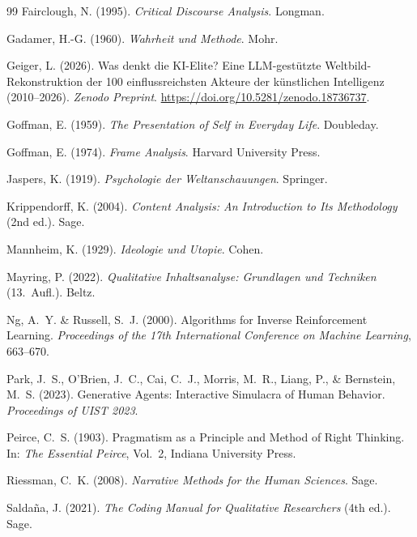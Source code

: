 \documentclass[11pt,a4paper]{article}
\theoremstyle{definition}
\theoremstyle{plain}
\theoremstyle{remark}
\begin{document}
\begin{thebibliography}{99}
  Fairclough, N. (1995).
  \textit{Critical Discourse Analysis}.
  Longman.

  Gadamer, H.-G. (1960).
  \textit{Wahrheit und Methode}.
  Mohr.

  Geiger, L. (2026).
  Was denkt die KI-Elite? Eine LLM-gest\"utzte Weltbild-Rekonstruktion der 100 einflussreichsten Akteure der k\"unstlichen Intelligenz (2010--2026).
  \textit{Zenodo Preprint}. \url{https://doi.org/10.5281/zenodo.18736737}.

  Goffman, E. (1959).
  \textit{The Presentation of Self in Everyday Life}.
  Doubleday.

  Goffman, E. (1974).
  \textit{Frame Analysis}.
  Harvard University Press.

  Jaspers, K. (1919).
  \textit{Psychologie der Weltanschauungen}.
  Springer.

  Krippendorff, K. (2004).
  \textit{Content Analysis: An Introduction to Its Methodology} (2nd ed.).
  Sage.

  Mannheim, K. (1929).
  \textit{Ideologie und Utopie}.
  Cohen.

  Mayring, P. (2022).
  \textit{Qualitative Inhaltsanalyse: Grundlagen und Techniken} (13.\ Aufl.).
  Beltz.

  Ng, A.~Y. \& Russell, S.~J. (2000).
  Algorithms for Inverse Reinforcement Learning.
  \textit{Proceedings of the 17th International Conference on Machine Learning}, 663--670.

  Park, J.~S., O'Brien, J.~C., Cai, C.~J., Morris, M.~R., Liang, P., \& Bernstein, M.~S. (2023).
  Generative Agents: Interactive Simulacra of Human Behavior.
  \textit{Proceedings of UIST 2023}.

  Peirce, C.~S. (1903).
  Pragmatism as a Principle and Method of Right Thinking.
  In: \textit{The Essential Peirce}, Vol.~2, Indiana University Press.

  Riessman, C.~K. (2008).
  \textit{Narrative Methods for the Human Sciences}.
  Sage.

  Salda\~{n}a, J. (2021).
  \textit{The Coding Manual for Qualitative Researchers} (4th ed.).
  Sage.


\end{thebibliography}
\end{document}
